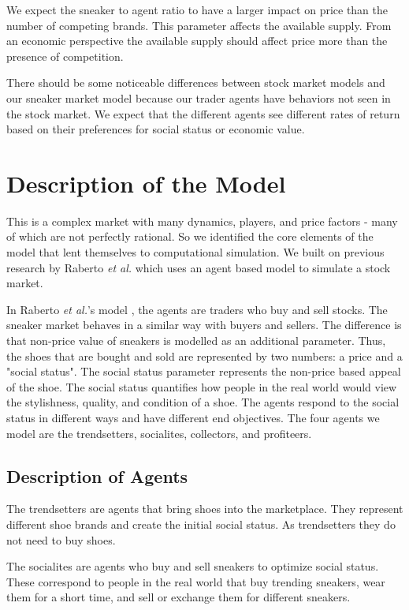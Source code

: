 \documentclass[12pt]{article}
\begin{document}
We expect the sneaker to agent ratio to have a larger impact on price than the number of competing brands. This parameter affects the available supply. From an economic perspective the available supply should affect price more than the presence of competition. 

There should be some noticeable differences between stock market models and our sneaker market model because our trader agents have behaviors not seen in the stock market. We expect that the different agents see different rates of return based on their preferences for social status or economic value.


\newpage
\section{Description of the Model}

This is a complex market with many dynamics, players, and price factors - many of which are not perfectly rational. So we identified the core elements of the model that lent themselves to computational simulation. We built on previous research by Raberto \textit{et al.} \cite{Agent_Model}
which uses an agent based model to simulate a stock market. 

In Raberto \textit{et al.}'s model \cite{Agent_Model}, the agents are traders who buy and sell stocks. The sneaker market behaves in a similar way with buyers and sellers. The difference is that non-price value of sneakers is modelled as an additional parameter. Thus, the shoes that are bought and sold are represented by two numbers: a price and a "social status". The social status parameter represents the non-price based appeal of the shoe. The social status quantifies how people in the real world would view the stylishness, quality, and condition of a shoe. The agents respond to the social status in different ways and have different end objectives. The four agents we model are the trendsetters, socialites, collectors, and profiteers. 

\subsection{Description of Agents}
The trendsetters are agents that bring shoes into the marketplace. They represent different shoe brands and create the initial social status. As trendsetters they do not need to buy shoes.

The socialites are agents who buy and sell sneakers to optimize social status. These correspond to people in the real world that buy trending sneakers, wear them for a short time, and sell or exchange them for different sneakers.
\end{document}
